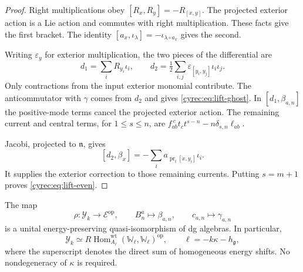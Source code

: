 \begin{proof}
Right multiplications obey $[R_x,R_y]=-R_{[x,y]}$.
The projected exterior action is a Lie action and commutes with
right multiplication. These facts give the first bracket.
The identity $[a_x,\iota_\lambda]=-\iota_{\lambda\circ a_x}$
gives the second.

Writing $\varepsilon_y$ for exterior multiplication, the two
pieces of the differential are
\[
 d_1=\sum_iR_{y_i}\iota_i,
 \qquad
 d_2=\tfrac12\sum_{i,j}\varepsilon_{[y_i,y_j]}\iota_i\iota_j.
\]
Only contractions from the input exterior monomial contribute.
The anticommutator with $\gamma$ comes from $d_2$ and gives
\eqref{cyrec:eq:lift-ghost}. In $[d_1,\beta_{a,n}]$ the
positive-mode terms cancel the projected exterior action.
The remaining current and central terms, for $1\leq s\leq n$,
are $f_{ab}^{\ c}t_ct^{s-n}-n\delta_{s,n}\ell_{ab}$.

Jacobi, projected to $\mathfrak n$, gives
\[
 [d_2,\beta_x]=
       -\sum_i a_{\operatorname{pr}_{\mathfrak l}[x,y_i]}\iota_i.
\]
It supplies the exterior correction to those remaining currents.
Putting $s=m+1$ proves \eqref{cyrec:eq:lift-even}.
\end{proof}

\begin{theorem}\label{cyrec:thm:affine-endomorphisms}
The map
\begin{equation}\label{cyrec:eq:rho}
 \rho:\mathcal Y_k\longrightarrow\mathcal E^{\mathrm{op}},
 \qquad B^a_n\longmapsto\beta_{a,n},
 \qquad c_{a,n}\longmapsto\gamma_{a,n}
\end{equation}
is a unital energy-preserving quasi-isomorphism of dg algebras.
In particular,
\[
 \mathcal Y_k\simeq
 R\operatorname{Hom}^{\mathrm{wt}}_{A_\ell}
       (\mathbb W_\ell,\mathbb W_\ell)^{\mathrm{op}},
 \qquad\ell=-k\kappa-h_{\mathfrak g},
\]
where the superscript denotes the direct sum of homogeneous energy
shifts. No nondegeneracy of $\kappa$ is required.
\end{theorem}

